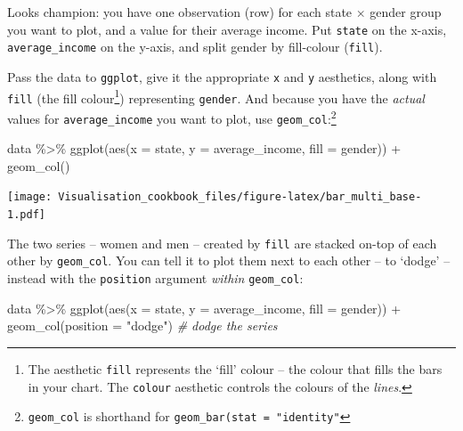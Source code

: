 \documentclass[
]{book}
\newenvironment{Shaded}{\begin{snugshade}}{\end{snugshade}}
\newcommand{\AttributeTok}[1]{\textcolor[rgb]{0.77,0.63,0.00}{#1}}
\newcommand{\CommentTok}[1]{\textcolor[rgb]{0.56,0.35,0.01}{\textit{#1}}}
\newcommand{\FunctionTok}[1]{\textcolor[rgb]{0.00,0.00,0.00}{#1}}
\newcommand{\NormalTok}[1]{#1}
\newcommand{\SpecialCharTok}[1]{\textcolor[rgb]{0.00,0.00,0.00}{#1}}
\newcommand{\StringTok}[1]{\textcolor[rgb]{0.31,0.60,0.02}{#1}}
\begin{document}
Looks champion: you have one observation (row) for each state \(\times\) gender group you want to plot, and a value for their average income. Put \texttt{state} on the x-axis, \texttt{average\_income} on the y-axis, and split gender by fill-colour (\texttt{fill}).

Pass the data to \texttt{ggplot}, give it the appropriate \texttt{x} and \texttt{y} aesthetics, along with \texttt{fill} (the fill colour\footnote{The aesthetic \texttt{fill} represents the `fill' colour -- the colour that fills the bars in your chart. The \texttt{colour} aesthetic controls the colours of the \emph{lines}.}) representing \texttt{gender}. And because you have the \emph{actual} values for \texttt{average\_income} you want to plot, use \texttt{geom\_col}:\footnote{\texttt{geom\_col} is shorthand for \texttt{geom\_bar(stat\ =\ "identity"}}

\begin{Shaded}
\begin{Highlighting}[]
\NormalTok{data }\SpecialCharTok{\%\textgreater{}\%} 
  \FunctionTok{ggplot}\NormalTok{(}\FunctionTok{aes}\NormalTok{(}\AttributeTok{x =}\NormalTok{ state,}
             \AttributeTok{y =}\NormalTok{ average\_income,}
             \AttributeTok{fill =}\NormalTok{ gender)) }\SpecialCharTok{+} 
  \FunctionTok{geom\_col}\NormalTok{()}
\end{Highlighting}
\end{Shaded}

\texttt{[image: Visualisation\_cookbook\_files/figure-latex/bar\_multi\_base-1.pdf]}

The two series -- women and men -- created by \texttt{fill} are stacked on-top of each other by \texttt{geom\_col}. You can tell it to plot them next to each other -- to `dodge' -- instead with the \texttt{position} argument \emph{within} \texttt{geom\_col}:

\begin{Shaded}
\begin{Highlighting}[]
\NormalTok{data }\SpecialCharTok{\%\textgreater{}\%} 
  \FunctionTok{ggplot}\NormalTok{(}\FunctionTok{aes}\NormalTok{(}\AttributeTok{x =}\NormalTok{ state,}
             \AttributeTok{y =}\NormalTok{ average\_income,}
             \AttributeTok{fill =}\NormalTok{ gender)) }\SpecialCharTok{+} 
  \FunctionTok{geom\_col}\NormalTok{(}\AttributeTok{position =} \StringTok{"dodge"}\NormalTok{) }\CommentTok{\# \textquotesingle{}dodge\textquotesingle{} the series}
\end{Highlighting}
\end{Shaded}
\end{document}
